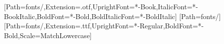 \usepackage[letterpaper,top=1in,bottom=1.2in,hmargin=1.4in,footskip=0.7in,headheight=14pt,headsep=0.3in]{geometry}
\usepackage{amsmath,amssymb}
\usepackage{fontspec}
\usepackage[mathbf=sym]{unicode-math}
\setmainfont{NewCM10}[Path=fonts/,Extension=.otf,UprightFont=*-Book,ItalicFont=*-BookItalic,BoldFont=*-Bold,BoldItalicFont=*-BoldItalic]
[Path=fonts/]
\setmonofont{FiraCodeNerdFontMono}[Path=fonts/,Extension=.ttf,UprightFont=*-Regular,BoldFont=*-Bold,Scale=MatchLowercase]
\usepackage{microtype}
\usepackage{newunicodechar}

\usepackage{setspace}
\usepackage{graphicx}
\graphicspath{{figures/dissertation/}}
\usepackage{array,calc,booktabs,longtable,multirow}
